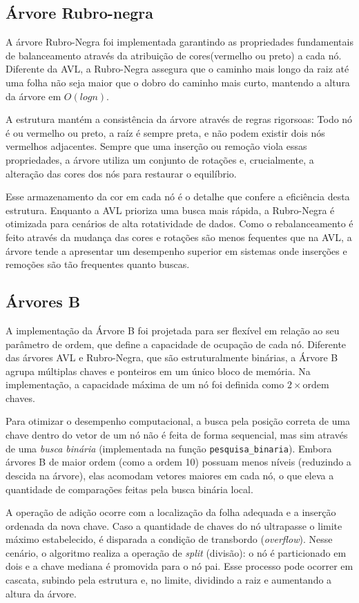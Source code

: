 \documentclass[a4paper, 12pt]{article}
\begin{document}
\subsection{Árvore Rubro-negra}
A árvore Rubro-Negra foi implementada garantindo as propriedades fundamentais de balanceamento através da atribuição de cores(vermelho ou preto) a cada nó. Diferente da AVL, a Rubro-Negra assegura que o caminho mais longo da raiz até uma folha não seja maior que o dobro do caminho mais curto, mantendo a altura da árvore em $O(logn)$.

A estrutura mantém a consistência da árvore através de regras rigorsoas: Todo nó é ou vermelho ou preto, a raíz é sempre preta, e não podem existir dois nós vermelhos adjacentes. Sempre que uma inserção ou remoção viola essas propriedades, a árvore utiliza um conjunto de rotações e, crucialmente, a alteração das cores dos nós para restaurar o equilíbrio.

Esse armazenamento da cor em cada nó é o detalhe que confere a eficiência desta estrutura. Enquanto a AVL prioriza uma busca mais rápida, a Rubro-Negra é otimizada para cenários de alta rotatividade de dados. Como o rebalanceamento é feito através da mudança das cores e rotações são menos fequentes que na AVL, a árvore tende a apresentar um desempenho superior em sistemas onde inserções e remoções são tão frequentes quanto buscas.


\subsection{Árvores B}
A implementação da Árvore B foi projetada para ser flexível em relação ao seu parâmetro de ordem, que define a capacidade de ocupação de cada nó. Diferente das árvores AVL e Rubro-Negra, que são estruturalmente binárias, a Árvore B agrupa múltiplas chaves e ponteiros em um único bloco de memória. Na implementação, a capacidade máxima de um nó foi definida como $2 \times \text{ordem}$ chaves.

Para otimizar o desempenho computacional, a busca pela posição correta de uma chave dentro do vetor de um nó não é feita de forma sequencial, mas sim através de uma \textit{busca binária} (implementada na função \verb|pesquisa_binaria|). Embora árvores B de maior ordem (como a ordem 10) possuam menos níveis (reduzindo a descida na árvore), elas acomodam vetores maiores em cada nó, o que eleva a quantidade de comparações feitas pela busca binária local.

A operação de adição ocorre com a localização da folha adequada e a inserção ordenada da nova chave. Caso a quantidade de chaves do nó ultrapasse o limite máximo estabelecido, é disparada a condição de transbordo (\textit{overflow}). Nesse cenário, o algoritmo realiza a operação de \textit{split} (divisão): o nó é particionado em dois e a chave mediana é promovida para o nó pai. Esse processo pode ocorrer em cascata, subindo pela estrutura e, no limite, dividindo a raiz e aumentando a altura da árvore.
\end{document}

